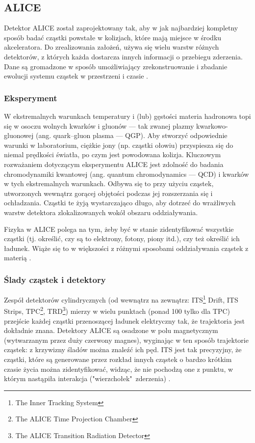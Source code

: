 \newpage
\subsection{ALICE}
Detektor ALICE został zaprojektowany tak, aby w jak najbardziej kompletny sposób badać cząstki powstałe w kolizjach, które mają miejsce w środku akceleratora. Do zrealizowania założeń, używa się wielu warstw różnych detektorów, z których każda dostarcza innych informacji o przebiegu zderzenia. Dane są gromadzone w sposób umożliwiający zrekonstruowanie i zbadanie ewolucji systemu cząstek w przestrzeni i czasie \cite{aliceofficial}. 

\subsubsection{Eksperyment}
W ekstremalnych warunkach temperatury i (lub) gęstości materia hadronowa topi się w osoczu wolnych kwarków i gluonów --- tak zwanej plazmy kwarkowo-gluonowej (ang. quark–gluon plasma --- QGP). Aby stworzyć odpowiednie warunki w laboratorium, ciężkie jony (np. cząstki ołowiu) przyspiesza się do niemal prędkości światła, po czym jest powodowana kolizja. Kluczowym rozważaniem dotyczącym eksperymentu ALICE jest zdolność do badania chromodynamiki kwantowej (ang.  quantum chromodynamics --- QCD) i kwarków w tych ekstremalnych warunkach. Odbywa się to przy użyciu cząstek, utworzonych wewnątrz gorącej objętości podczas jej rozszerzania się i ochładzania. Cząstki te żyją wystarczająco długo, aby dotrzeć do wrażliwych warstw detektora zlokalizowanych wokół obszaru oddziaływania.

 Fizyka w ALICE polega na tym, żeby być w stanie zidentyfikować wszystkie cząstki (tj. określić, czy są to elektrony, fotony, piony itd.), czy też określić ich ładunek. Wiąże się to w większości z różnymi sposobami oddziaływania cząstek z materią \cite{aliceexperiment}.

\subsubsection{Ślady cząstek i detektory}
Zespół detektorów cylindrycznych (od wewnątrz na zewnątrz: ITS\footnote{The Inner Tracking System}  Drift, ITS Strips, TPC\footnote{The ALICE Time Projection Chamber}, TRD\footnote{The ALICE Transition Radiation Detector}) mierzy w wielu punktach (ponad 100 tylko dla TPC) przejście każdej cząstki przenoszącej ładunek elektryczny tak, że trajektoria jest dokładnie znana. Detektory ALICE są osadzone w polu magnetycznym (wytwarzanym przez duży czerwony magnes), wyginając w ten sposób trajektorie cząstek: z krzywizny śladów można znaleźć ich pęd. ITS jest tak precyzyjny, że cząstki, które są generowane przez rozkład innych cząstek o bardzo krótkim czasie życia można zidentyfikować, widząc, że nie pochodzą one z punktu, w którym nastąpiła interakcja ("wierzchołek"\ zderzenia) \cite{trackingparticles}.

